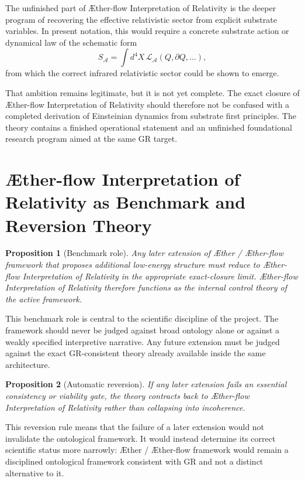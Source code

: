 \documentclass[11pt]{article}
\newcommand{\Aether}{\AE{}ther}
\newcommand{\Aflow}{\AE{}ther-flow}
\newcommand{\TheoryName}{\Aflow{} Interpretation of Relativity}
\newcommand{\TheoryProgram}{\Aether{} / \Aflow{} framework}
\newtheorem{proposition}{Proposition}
\begin{document}
The unfinished part of \TheoryName{} is the deeper program of recovering the effective relativistic sector from explicit substrate variables. In present notation, this would require a concrete substrate action or dynamical law of the schematic form
\begin{equation}
S_{\mathcal A}
=
\int d^4X\,\mathcal L_{\mathcal A}(Q,\partial Q,\ldots),
\label{eq:substrateaction}
\end{equation}
from which the correct infrared relativistic sector could be shown to emerge.

That ambition remains legitimate, but it is not yet complete. The exact closure of \TheoryName{} should therefore not be confused with a completed derivation of Einsteinian dynamics from substrate first principles. The theory contains a finished operational statement and an unfinished foundational research program aimed at the same GR target.

\section{\TheoryName{} as Benchmark and Reversion Theory}

\begin{proposition}[Benchmark role]
Any later extension of \TheoryProgram{} that proposes additional low-energy structure must reduce to \TheoryName{} in the appropriate exact-closure limit. \TheoryName{} therefore functions as the internal control theory of the active framework.
\end{proposition}

This benchmark role is central to the scientific discipline of the project. The framework should never be judged against broad ontology alone or against a weakly specified interpretive narrative. Any future extension must be judged against the exact GR-consistent theory already available inside the same architecture.

\begin{proposition}[Automatic reversion]
If any later extension fails an essential consistency or viability gate, the theory contracts back to \TheoryName{} rather than collapsing into incoherence.
\end{proposition}

This reversion rule means that the failure of a later extension would not invalidate the ontological framework. It would instead determine its correct scientific status more narrowly: \TheoryProgram{} would remain a disciplined ontological framework consistent with GR and not a distinct alternative to it.
\end{document}
